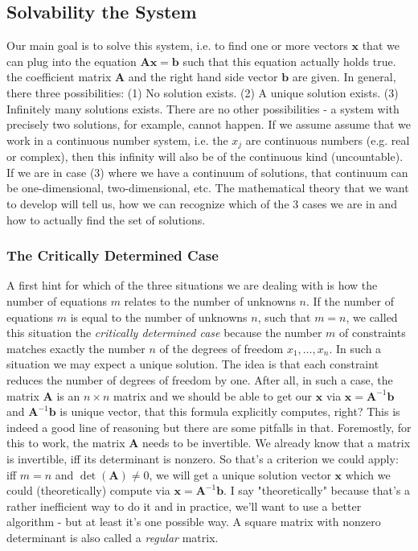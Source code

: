 
\subsection{Solvability the System}
Our main goal is to solve this system, i.e. to find one or more vectors $\mathbf{x}$ that we can plug into the equation $\mathbf{A x} = \mathbf{b}$ such that this equation actually holds true. the coefficient matrix $\mathbf{A}$ and the right hand side vector $\mathbf{b}$ are given. In general, there three possibilities: (1) No solution exists. (2) A unique solution exists. (3) Infinitely many solutions exists. There are no other possibilities - a system with precisely two solutions, for example, cannot happen. If we assume assume that we work in a continuous number system, i.e. the $x_j$ are continuous numbers (e.g. real or complex), then this infinity will also be of the continuous kind (uncountable). If we are in case (3) where we have a continuum of solutions, that continuum can be one-dimensional, two-dimensional, etc. The mathematical theory that we want to develop will tell us, how we can recognize which of the 3 cases we are in and how to actually find the set of solutions.

\subsubsection{The Critically Determined Case}
A first hint for which of the three situations we are dealing with is how the number of equations $m$ relates to the number of unknowns $n$. If the number of equations $m$ is equal to the number of unknowns $n$, such that $m=n$, we called this situation the \emph{critically determined case} because the number $m$ of constraints matches exactly the number $n$ of the degrees of freedom $x_1, \ldots, x_n$. In such a situation we may expect a unique solution. The idea is that each constraint reduces the number of degrees of freedom by one. After all, in such a case, the matrix $\mathbf{A}$ is an $n \times n$ matrix and we should be able to get our $\mathbf{x}$ via $\mathbf{x} = \mathbf{A}^{-1} \mathbf{b}$ and $\mathbf{A}^{-1} \mathbf{b}$ is unique vector, that this formula explicitly computes, right? This is indeed a good line of reasoning but there are some pitfalls in that. Foremostly, for this to work, the matrix $\mathbf{A}$ needs to be invertible. We already know that a matrix is invertible, iff its determinant is nonzero. So that's a criterion we could apply: iff $m = n$ and $\det(\mathbf{A}) \neq 0$, we will get a unique solution vector $\mathbf{x}$ which we could (theoretically) compute via $\mathbf{x} = \mathbf{A}^{-1} \mathbf{b}$. I say "theoretically" because that's a rather inefficient way to do it and in practice, we'll want to use a better algorithm - but at least it's one possible way. A square matrix with nonzero determinant is also called a \emph{regular} matrix.

